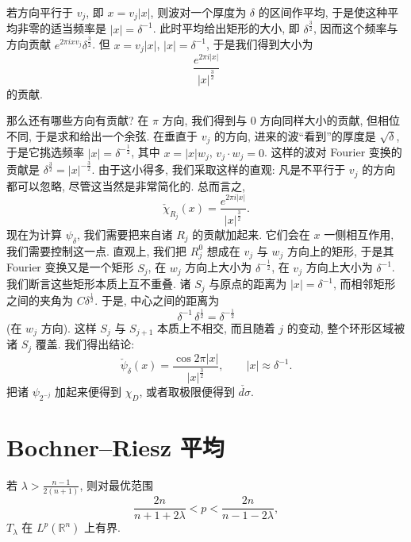 若方向平行于 $v_j$, 即 $x=v_j|x|$, 则波对一个厚度为 $\delta$ 的区间作平均, 于是使这种平均非零的适当频率是 $|x|=\delta^{-1}$. 此时平均给出矩形的大小, 即 $\delta^{\frac{3}{2}}$, 因而这个频率与方向贡献 $e^{2\pi ixv_j}\delta^{\frac{3}{2}}$. 但 $x=v_j|x|$, $|x|=\delta^{-1}$, 于是我们得到大小为
\[
\frac{e^{2\pi i|x|}}{|x|^{\frac{3}{2}}}
\]
的贡献.

那么还有哪些方向有贡献? 在 $\pi$ 方向, 我们得到与 $0$ 方向同样大小的贡献, 但相位不同, 于是求和给出一个余弦. 在垂直于 $v_j$ 的方向, 进来的波``看到''的厚度是 $\sqrt{\delta}$, 于是它挑选频率 $|x|=\delta^{-\frac{1}{2}}$, 其中 $x=|x|w_j$, $v_j\cdot w_j=0$. 这样的波对 Fourier 变换的贡献是 $\delta^{\frac{3}{2}}=|x|^{-\frac{3}{2}}$. 由于这小得多, 我们采取这样的直观: 凡是不平行于 $v_{j}$ 的方向都可以忽略, 尽管这当然是非常简化的. 总而言之,
\[
\check{\chi}_{R_{j}}(x)=\frac{e^{2\pi i|x|}}{|x|^{\frac{3}{2}}}.
\]
现在为计算 $\psi_\delta$, 我们需要把来自诸 $R_j$ 的贡献加起来. 它们会在 $x$ 一侧相互作用, 我们需要控制这一点. 直观上, 我们把 $R_j^0$ 想成在 $v_j$ 与 $w_j$ 方向上的矩形, 于是其 Fourier 变换又是一个矩形 $S_j$, 在 $w_j$ 方向上大小为 $\delta^{-\frac{1}{2}}$, 在 $v_j$ 方向上大小为 $\delta^{-1}$. 我们断言这些矩形本质上互不重叠. 诸 $S_j$ 与原点的距离为 $|x|=\delta^{-1}$, 而相邻矩形之间的夹角为 $C\delta^{\frac{1}{2}}$. 于是, 中心之间的距离为
\[
\delta^{-1}\,\delta^{\frac{1}{2}}=\delta^{-\frac{1}{2}}
\]
(在 $w_j$ 方向). 这样 $S_j$ 与 $S_{j+1}$ 本质上不相交, 而且随着 $j$ 的变动, 整个环形区域被诸 $S_j$ 覆盖. 我们得出结论:
\[
\check{\psi}_{\delta}(x)=\frac{\cos 2\pi|x|}{|x|^{\frac{3}{2}}},
\qquad |x|\approx\delta^{-1}.
\]
把诸 $\psi_{2^{-j}}$ 加起来便得到 $\chi_{D}$, 或者取极限便得到 $\check{d\sigma}$.

\section{Bochner--Riesz 平均}
\label{sec:6.2}

\begin{theorem}\label{thm:6.9}
若 $\lambda>\frac{n-1}{2(n+1)}$, 则对最优范围
\[
\frac{2n}{n+1+2\lambda}<p<\frac{2n}{n-1-2\lambda},
\]
$T_\lambda$ 在 $L^p(\mathbb{R}^n)$ 上有界.
\end{theorem}

